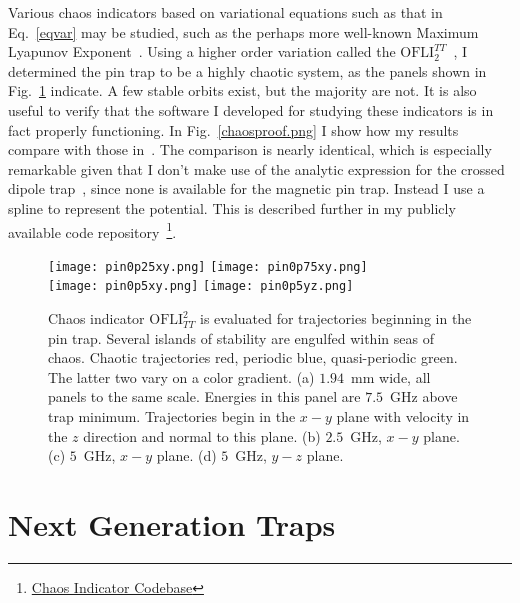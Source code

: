 Various chaos indicators based on variational equations such as that in Eq.~\ref{eqvar} may be studied, such as the perhaps more well-known Maximum Lyapunov Exponent~\cite{wolf1985}.
Using a higher order variation called the $\text{OFLI}_2^{TT}$~\cite{Barrio2006}, I determined the pin trap to be a highly chaotic system, as the panels shown in Fig.~\ref{pinchaos} indicate.
A few stable orbits exist, but the majority are not.
It is also useful to verify that the software I developed for studying these indicators is in fact properly functioning.
In Fig.~\ref{chaosproof.png} I show how my results compare with those in~\cite{Gonzalez-Ferez2014}.
The comparison is nearly identical, which is especially remarkable given that I don't make use of the analytic expression for the crossed dipole trap~\citep[Eq.~6]{Gonzalez-Ferez2014}, since none is available for the magnetic pin trap.
Instead I use a spline to represent the potential.
This is described further in my publicly available code repository~\footnote{\href{https://github.com/dreens/ofli-OH-trapping}{Chaos Indicator Codebase}}.


\begin{figure}[t!]
\centering
\texttt{[image: pin0p25xy.png]}\hspace{4.5mm}
\texttt{[image: pin0p75xy.png]}\\
\vspace{1mm}
\texttt{[image: pin0p5xy.png]}
\texttt{[image: pin0p5yz.png]}\\
\caption[Chaos Indicators in the Pin Trap]{Chaos indicator $\text{OFLI}_{TT}^2$ is evaluated for trajectories beginning in the pin trap. Several islands of stability are engulfed within seas of chaos. Chaotic trajectories red, periodic blue, quasi-periodic green. The latter two vary on a color gradient. (a) $1.94$~mm wide, all panels to the same scale. Energies in this panel are $7.5$~GHz above trap minimum. Trajectories begin in the $x-y$ plane with velocity in the $z$ direction and normal to this plane. (b) $2.5$~GHz, $x-y$ plane. (c) $5$~GHz, $x-y$ plane. (d) $5$~GHz, $y-z$ plane. }
\label{pinchaos}
\end{figure}


\section{Next Generation Traps}

